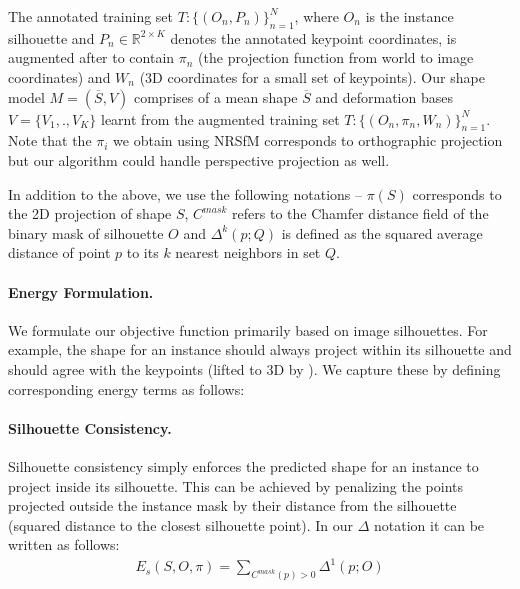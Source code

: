 
The annotated training set $T:\{(O_n, P_n)\}_{n=1}^N$, where $O_n$ is the instance silhouette and $P_n \in \mathbb{R}^{2 \times K}$ denotes the annotated keypoint coordinates, is augmented after \nrsfm to contain $\pi_n$ (the projection function from world to image coordinates) and $W_n$ (3D coordinates for a small set of keypoints).
Our shape model $M = (\overline{S},V)$ comprises of a mean shape $\overline{S}$ and deformation bases $V = \{ V_1,.,V_K \} $ learnt from the augmented training set $T:\{(O_n,\pi_n, W_n)\}_{n=1}^N$. Note that the $\pi_i$ we obtain using NRSfM corresponds to orthographic projection but our algorithm could handle perspective projection as well.

In addition to the above, we use the following notations  --  $\pi(S)$ corresponds to the 2D projection of shape $S$, $C^{mask}$ refers to the Chamfer distance field of the binary mask of silhouette $O$ and $\Delta^k(p;Q)$ is defined as the squared average distance of point $p$ to its $k$ nearest neighbors in set $Q$.

\paragraph{Energy Formulation.} We formulate our objective function primarily based on image silhouettes. For example, the shape for an instance should always project within its silhouette and should agree with the keypoints (lifted to 3D by \nrsfm). We capture these by defining corresponding energy terms as follows:

\paragraph{Silhouette Consistency.} Silhouette consistency simply enforces the predicted shape for an instance to project inside its silhouette. This can be achieved by penalizing the points projected outside the instance mask by their distance from the silhouette (\ie squared distance to the closest silhouette point). In our $\Delta$ notation it can be written as follows:
\begin{gather}
 \label{eq:sil_con}E_{s}(S,O,\pi)=\underset{C^{mask}(p)>0}{\sum}\Delta^1(p;O)
\end{gather}

